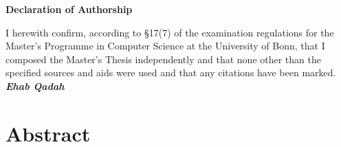 \documentclass[12pt, %
a4paper, %
twoside, %
openright, %
abstract=on, %
DIV=11,      %
BCOR=8mm,openright]{scrbook}
\begin{document}
	\frontmatter
	
	

	\vspace{4cm}
	
	
	\thispagestyle{empty}
	{\noindent%
		\huge{\textbf{\textsf{Declaration of Authorship}}}
	}
	\vspace{2cm}
	\begin{flushleft}
		\noindent%
				
	I herewith confirm, according to §17(7) of the examination regulations for the Master's Programme in Computer Science at the University of Bonn, that I composed the Master's Thesis independently and that none other than the specified sources and aids were used and that any
		citations have been marked.\\
		\vspace{1cm}
		\textbf{\textit{Ehab Qadah}}
	\end{flushleft}
	
	

	\chapter*{Abstract}
	\thispagestyle{empty}
    
    
    
	\newpage 
	   
	\listoffigures
	
	\mainmatter
	
		
	
	
	
	
	
	
	\FloatBarrier
	
	
	 
\end{document}
